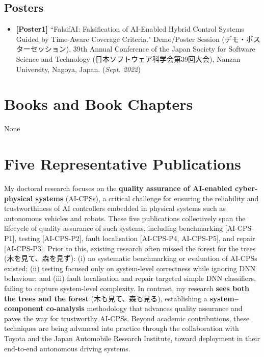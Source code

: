 \documentclass[11pt,a4paper]{moderncv}        %
\begin{document}
\subsection{Posters}

\begin{itemize}
    \item \textbf{[Poster1]} ``FalsifAI: Falsification of AI-Enabled Hybrid Control Systems Guided by Time-Aware Coverage Criteria." Demo/Poster Session (デモ・ポスターセッション), 39th Annual Conference of the Japan Society for Software Science and Technology (日本ソフトウェア科学会第39回大会), Nanzan University, Nagoya, Japan. (\textit{Sept. 2022})
\end{itemize}

\section{Books and Book Chapters}
None

\section{Five Representative Publications}


My doctoral research focuses on the \textbf{quality assurance of AI-enabled cyber-physical systems} (AI-CPSs), a critical challenge for ensuring the reliability and trustworthiness of AI controllers embedded in physical systems such as autonomous vehicles and robots. These five publications collectively span the lifecycle of quality assurance of such systems, including benchmarking [AI-CPS-P1], testing [AI-CPS-P2], fault localisation [AI-CPS-P4, AI-CPS-P5], and repair [AI-CPS-P3]. Prior to this, existing research often missed the forest for the trees (木を見て、森を見ず): (i) no systematic benchmarking or evaluation of AI-CPSs existed; (ii) testing focused only on system-level correctness while ignoring DNN behaviour; and (iii) fault localisation and repair targeted simple DNN classifiers, failing to capture system-level complexity. In contrast, my research \textbf{sees both the trees and the forest} (木も見て、森も見る), establishing a \textbf{system–component co-analysis} methodology that advances quality assurance and paves the way for trustworthy AI-CPSs. Beyond academic contributions, these techniques are being advanced into practice through the collaboration with Toyota and the Japan Automobile Research Institute, toward deployment in their end-to-end autonomous driving systems.
\end{document}

